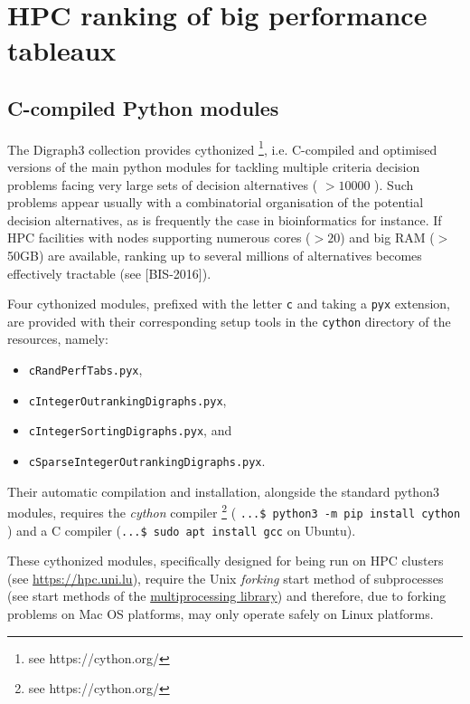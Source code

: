 \chapter{HPC ranking of big performance tableaux}
\label{sec:11}



\section{C-compiled Python modules}
\label{sec:11.1}

The Digraph3 collection provides cythonized \footnote{see https://cython.org/}, i.e. C-compiled and optimised versions of the main python modules for tackling multiple criteria decision problems facing very large sets of decision alternatives ( $> 10000$ ). Such problems appear usually with a combinatorial organisation of the potential decision alternatives, as is frequently the case in bioinformatics for instance. If HPC facilities with nodes supporting numerous cores ($> 20$) and big RAM ($>$ 50GB) are available, ranking up to several millions of alternatives becomes effectively tractable (see [BIS-2016]).

Four cythonized \Digraph modules, prefixed with the letter \texttt{c} and taking a \texttt{pyx} extension, are provided with their corresponding setup tools in the \texttt{cython} directory of the \Digraph resources, namely:
\begin{itemize}
\item[] \texttt{cRandPerfTabs.pyx},
\item[] \texttt{cIntegerOutrankingDigraphs.pyx},
\item[] \texttt{cIntegerSortingDigraphs.pyx}, and
\item[] \texttt{cSparseIntegerOutrankingDigraphs.pyx}.
\end{itemize}

Their automatic compilation and installation, alongside the standard \Digraph python3 modules, requires the \emph{cython} compiler \footnote{see https://cython.org/} ( \texttt{...\$ python3 -m pip install cython} ) and a C compiler (\texttt{...\$ sudo apt install gcc} on Ubuntu).

These cythonized modules, specifically designed for being run on HPC clusters (see \href{https://hpc.uni.lu}{https://hpc.uni.lu}), require the Unix \emph{forking} start method of subprocesses (see start methods of the \href{https://docs.python.org/3/library/multiprocessing.html#contexts-and-start-methods}{multiprocessing library})  and therefore, due to forking problems on Mac OS platforms, may only operate safely on Linux platforms.

